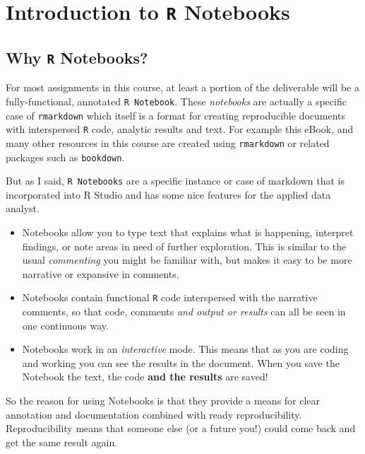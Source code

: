 \documentclass[
]{book}
\providecommand{\tightlist}{%
  \setlength{\itemsep}{0pt}\setlength{\parskip}{0pt}}
\begin{document}
\hypertarget{introduction-to-r-notebooks}{%
\chapter{\texorpdfstring{Introduction to \texttt{R} Notebooks}{Introduction to R Notebooks}}\label{introduction-to-r-notebooks}}

\hypertarget{why-r-notebooks}{%
\section{\texorpdfstring{Why \texttt{R} Notebooks?}{Why R Notebooks?}}\label{why-r-notebooks}}

For most assignments in this course, at least a portion of the deliverable will be a fully-functional, annotated \texttt{R\ Notebook}. These \emph{notebooks} are actually a specific case of \texttt{rmarkdown} which itself is a format for creating reproducible documents with interspersed \texttt{R} code, analytic results and text. For example this eBook, and many other resources in this course are created using \texttt{rmarkdown} or related packages such as \texttt{bookdown}.

But as I said, \texttt{R\ Notebooks} are a specific instance or case of markdown that is incorporated into R Studio and has some nice features for the applied data analyst.

\begin{itemize}
\tightlist
\item
  Notebooks allow you to type text that explains what is happening, interpret findings, or note areas in need of further exploration. This is similar to the usual \emph{commenting} you might be familiar with, but makes it easy to be more narrative or expansive in comments.
\item
  Notebooks contain functional \texttt{R} code interspersed with the narrative comments, so that code, comments \emph{and output or results} can all be seen in one continuous way.
\item
  Notebooks work in an \emph{interactive} mode. This means that as you are coding and working you can see the results in the document. When you save the Notebook the text, the code \textbf{and the results} are saved!
\end{itemize}

So the reason for using Notebooks is that they provide a means for clear annotation and documentation combined with ready reproducibility. Reproducibility means that someone else (or a future you!) could come back and get the same result again.
\end{document}

